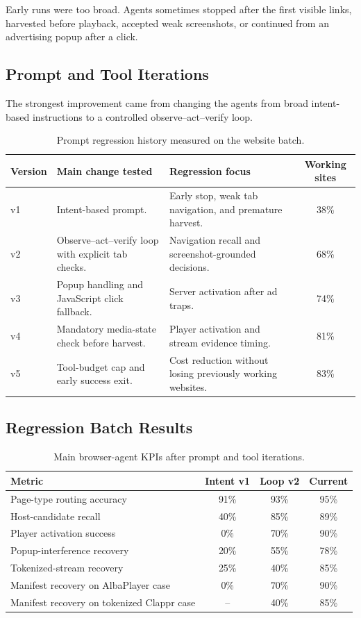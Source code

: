Early runs were too broad. Agents sometimes stopped after the first visible
links, harvested before playback, accepted weak screenshots, or continued from
an advertising popup after a click.

\subsection{Prompt and Tool Iterations}

The strongest improvement came from changing the agents from broad
intent-based instructions to a controlled observe--act--verify loop.

\begin{table}[!htbp]
\centering
\begin{tabularx}{\textwidth}{Q{1.4cm}Y Y C}
\toprule
{}
Version & Main change tested & Regression focus & Working sites \\
\midrule
v1 & Intent-based prompt. & Early stop, weak tab navigation, and premature
harvest. & 38\% \\
v2 & Observe--act--verify loop with explicit tab checks. & Navigation recall
and screenshot-grounded decisions. & 68\% \\
v3 & Popup handling and JavaScript click fallback. & Server activation after
ad traps. & 74\% \\
v4 & Mandatory media-state check before harvest. & Player activation and
stream evidence timing. & 81\% \\
v5 & Tool-budget cap and early success exit. & Cost reduction without losing
previously working websites. & 83\% \\
\bottomrule
\end{tabularx}
\caption{Prompt regression history measured on the website batch.}
\label{tab:prompt-regression}
\end{table}

\subsection{Regression Batch Results}

\begin{table}[!htbp]
\centering
\begin{tabularx}{\textwidth}{Q{4.4cm}C C C}
\toprule
{}
Metric & Intent v1 & Loop v2 & Current \\
\midrule
Page-type routing accuracy & 91\% & 93\% & 95\% \\
Host-candidate recall & 40\% & 85\% & 89\% \\
Player activation success & 0\% & 70\% & 90\% \\
Popup-interference recovery & 20\% & 55\% & 78\% \\
Tokenized-stream recovery & 25\% & 40\% & 85\% \\
Manifest recovery on AlbaPlayer case & 0\% & 70\% & 90\% \\
Manifest recovery on tokenized Clappr case & -- & 40\% & 85\% \\
\bottomrule
\end{tabularx}
\caption{Main browser-agent KPIs after prompt and tool iterations.}
\label{tab:manual-reference-results}
\end{table}

